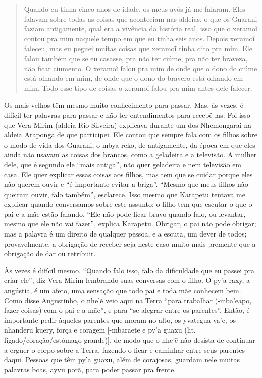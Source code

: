 \begin{quotation}
Quando eu tinha cinco anos de idade, os meus avós já me falaram. Eles
falavam sobre todas as coisas que aconteciam nas aldeias, o que os
Guarani faziam antigamente, qual era a vivência da história real, isso
que o xeramo\~{i} contou pra mim naquele tempo em que eu tinha seis
anos. Depois xeramo\~{i} faleceu, mas eu peguei muitas coisas que
xeramo\~{i} tinha dito pra mim. Ele falou também que se eu casasse, pra
não ter ciúme, pra não ter braveza, não ficar ciumento. O xeramo\~{i}
falou pra mim de onde que o dono do ciúme está olhando em mim, de onde
que o dono do bravero está olhando em mim. Todo esse tipo de coisas o
xeramo\~{i} falou pra mim antes dele falecer.
\end{quotation}

Os mais velhos têm mesmo muito conhecimento para passar. Mas, às vezes, é
difícil ter palavras para passar e não ter entendimentos para
recebê-las. Foi isso que Vera Mirim (aldeia Rio Silveira) explicava
durante um dos Nhemongarai na aldeia Araponga de que participei. Ele
contou que sempre fala com os filhos sobre o modo de vida dos Guarani,
o mbya reko, de antigamente, da época em que eles ainda não usavam as
coisas dos brancos, como a geladeira e a televisão. A mulher dele, que
é segundo ele ``mais antiga'', não quer geladeira e nem televisão em
casa. Ele quer explicar essas coisas aos filhos, mas tem que se cuidar
porque eles não querem ouvir e ``é importante evitar a briga''. ``Mesmo
que meus filhos não queiram ouvir, falo também'', esclarece. Isso mesmo
que Karapetu tentava me explicar quando conversamos sobre este assunto:
o filho tem que escutar o que o pai e a mãe estão falando. ``Ele não
pode ficar bravo quando falo, ou levantar, mesmo que ele não vai
fazer'', explica Karapetu. Obrigar, o pai não pode obrigar; mas a
palavra é um direito de qualquer pessoa, e a escuta, um dever de todos;
provavelmente, a obrigação de receber seja neste caso muito mais
premente que a obrigação de dar ou retribuir. 

Às vezes é difícil mesmo. ``Quando falo isso, falo da dificuldade que eu
passei pra criar ele'', diz Vera Mirim lembrando suas conversas com o
filho. O py’a raxy, a angústia, é um afeto, uma sensação que todo pai e
toda mãe conhecem bem. Como disse Augustinho, o nhe’\~{e} veio aqui
na Terra ``para trabalhar (-mba’eapo, fazer coisas) com o pai e a mãe'',
e para ``se alegrar entre os parentes''. Então, é importante pedir
àqueles parentes que moram no alto, os yvategua va’e, os nhanderu
kuery, força e coragem [-mbaraete e py’a guaxu (lit.
fígado/coração/estômago grande)], de modo que o nhe’\~{e} não desista
de continuar a erguer o corpo sobre a Terra, fazendo-o ficar e caminhar
entre seus parentes daqui. Pessoas que têm py’a guaxu, além de
corajosas, guardam nele muitas palavras boas, ayvu porã, para poder
passar pra frente.

